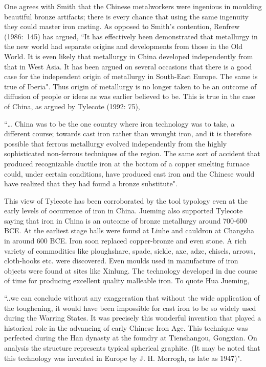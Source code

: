 One agrees with Smith that the Chinese metalworkers were ingenious in moulding beautiful bronze artifacts; there is every chance that using the same ingenuity they could master iron casting. As opposed to Smith's contention, Renfrew (1986:~145) has argued, “It has effectively been demonstrated that metallurgy in the new world had separate origins and developments from those in the Old World. It is even likely that metallurgy in China developed independently from that in West Asia. It has been argued on several occasions that there is a good case for the independent origin of metallurgy in South-East Europe. The same is true of Iberia". Thus origin of metallurgy is no longer taken to be an outcome of diffusion of people or ideas as was earlier believed to be. This is true in the case of China, as argued by Tylecote (1992: 75),

{\footnotesize “… China was to be the one country where iron technology was to take, a different course; towards cast iron rather than wrought iron, and it is therefore possible that ferrous metallurgy evolved independently from the highly sophisticated non-ferrous techniques of the region. The same sort of accident that produced recognizable ductile iron at the bottom of a copper smelting furnace could, under certain conditions, have produced cast iron and the Chinese would have realized that they had found a bronze substitute". }

\newpage

This view of Tylecote has been corroborated by the tool typology even at the early levels of occurrence of iron in China. Jueming also supported Tylecote saying that iron in China is an outcome of bronze metallurgy around 700-600 BCE. At the earliest stage balls were found at Liuhe and cauldron at Changsha in around 600 BCE. Iron soon replaced copper-bronze and even stone. A rich variety of commodities like ploughshare, spade, sickle, axe, adze, chisels, arrows, cloth-hooks etc. were discovered. Even moulds used in manufacture of iron objects were found at sites like Xinlung. The technology developed in due course of time for producing excellent quality malleable iron. To quote Hua Jueming, 

{\footnotesize “..we can conclude without any exaggeration that without the wide application of the toughening, it would have been impossible for cast iron to be so widely used during the Warring States. It was precisely this wonderful invention that played a historical role in the advancing of early Chinese Iron Age. This technique was perfected during the Han dynasty at the foundry at Tienshangou, Gongxian. On analysis the structure represents typical spherical graphite. (It may be noted that this technology was invented in Europe by J. H. Morrogh, as late as 1947)".}

